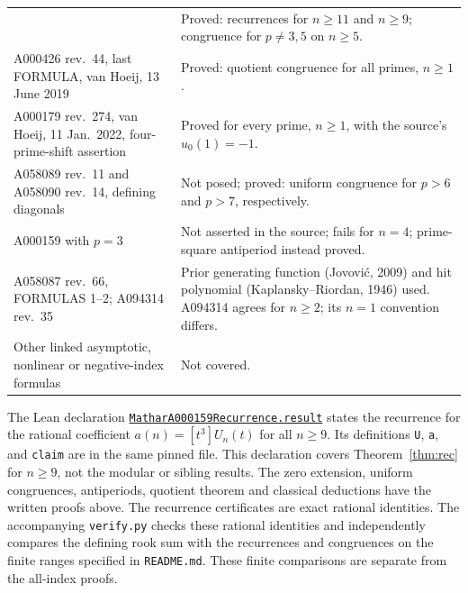 \documentclass[11pt]{article}
\newcommand{\coeff}[2]{[#1^{#2}]}
\begin{document}
\begin{longtable}{p{.46\linewidth}p{.45\linewidth}}
& Proved: recurrences for $n\geq11$ and $n\geq9$; congruence for $p\ne3,5$ on $n\geq5$.\\[3pt]
A000426 rev.~44, last FORMULA, van Hoeij, 13 June 2019
& Proved: quotient congruence for all primes, $n\geq1$.\\[3pt]
A000179 rev.~274, van Hoeij, 11 Jan.~2022, four-prime-shift assertion
& Proved for every prime, $n\geq1$, with the source's $u_0(1)=-1$.\\[3pt]
A058089 rev.~11 and A058090 rev.~14, defining diagonals
& Not posed; proved: uniform congruence for $p>6$ and $p>7$, respectively.\\[3pt]
A000159 with $p=3$
& Not asserted in the source; fails for $n=4$; prime-square antiperiod instead proved.\\[3pt]
A058087 rev.~66, FORMULAS 1--2; A094314 rev.~35
& Prior generating function (Jovovi\'c, 2009) and hit polynomial (Kaplansky--Riordan, 1946) used. A094314 agrees for $n\geq2$; its $n=1$ convention differs.\\[3pt]
Other linked asymptotic, nonlinear or negative-index formulas
& Not covered.\\
\bottomrule
\end{longtable}\endgroup

The Lean declaration
\href{https://github.com/the-omega-institute/trureturing/blob/8acba483bc80695fef00c6b8c491e2ae16d5145f/D5/S1/Recurrence/Invariants/MatharA000159Recurrence.lean#L656}{\texttt{MatharA000159Recurrence.result}}
states the recurrence for the rational coefficient
$a(n)=\coeff{t}{3}U_n(t)$ for all $n\geq9$.
Its definitions \texttt{U}, \texttt{a}, and \texttt{claim} are in the same
pinned file. This declaration covers Theorem~\ref{thm:rec} for $n\geq9$,
not the modular or sibling results. The zero extension, uniform congruences,
antiperiods, quotient theorem and classical deductions have the written
proofs above. The recurrence certificates are exact rational identities.
The accompanying \texttt{verify.py} checks these rational identities and
independently compares the defining rook sum with the recurrences and
congruences on the finite ranges specified in \texttt{README.md}.
These finite comparisons are separate from the all-index proofs.
\end{document}
